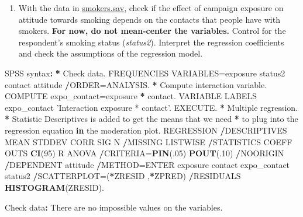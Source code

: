 \documentclass[a4paper]{book}
\newenvironment{Shaded}{\begin{snugshade}}{\end{snugshade}}
\newcommand{\KeywordTok}[1]{\textcolor[rgb]{0,0,0}{\textbf{#1}}}
\newcommand{\DecValTok}[1]{\textcolor[rgb]{0.00,0.00,0.00}{#1}}
\newcommand{\StringTok}[1]{\textcolor[rgb]{0.00,0.00,0.00}{#1}}
\newcommand{\ControlFlowTok}[1]{\textcolor[rgb]{0.00,0.00,0.00}{\textbf{#1}}}
\newcommand{\OperatorTok}[1]{\textcolor[rgb]{0.00,0.00,0.00}{\textbf{#1}}}
\newcommand{\ErrorTok}[1]{\textcolor[rgb]{0.00,0.00,0.00}{\textbf{#1}}}
\newcommand{\NormalTok}[1]{#1}
\providecommand{\tightlist}{%
  \setlength{\itemsep}{0pt}\setlength{\parskip}{0pt}}
\theoremstyle{definition}
\theoremstyle{definition}
\theoremstyle{definition}
\theoremstyle{remark}
\begin{document}
\begin{enumerate}
\def\labelenumi{\arabic{enumi}.}
\tightlist
\item
  With the data in
  \href{http://82.196.4.233:3838/data/smokers.sav}{smokers.sav}, check
  if the effect of campaign exposure on attitude towards smoking depends
  on the contacts that people have with smokers. \textbf{For now, do not
  mean-center the variables.} Control for the respondent's smoking
  status (\emph{status2}). Interpret the regression coefficients and
  check the assumptions of the regression model.
\end{enumerate}

\begin{Shaded}
\begin{Highlighting}[]
\NormalTok{SPSS syntax}\OperatorTok{:}\StringTok{  }
\StringTok{  }
\ErrorTok{*}\StringTok{ }\NormalTok{Check data.  }
\NormalTok{FREQUENCIES VARIABLES=exposure status2 contact attitude  }
  \OperatorTok{/}\NormalTok{ORDER=ANALYSIS.  }
\OperatorTok{*}\StringTok{ }\NormalTok{Compute interaction variable.  }
\NormalTok{COMPUTE expo_contact=exposure }\OperatorTok{*}\StringTok{ }\NormalTok{contact.  }
\NormalTok{VARIABLE LABELS  expo_contact }\StringTok{'Interaction exposure * contact'}\NormalTok{.  }
\NormalTok{EXECUTE.  }
\OperatorTok{*}\StringTok{ }\NormalTok{Multiple regression.  }
\OperatorTok{*}\StringTok{ }\NormalTok{Statistic Descriptives is added to get the means that we need  }
\OperatorTok{*}\StringTok{ }\NormalTok{to plug into the regression equation }\ControlFlowTok{in}\NormalTok{ the moderation plot.  }
\NormalTok{REGRESSION  }
  \OperatorTok{/}\NormalTok{DESCRIPTIVES MEAN STDDEV CORR SIG N  }
  \OperatorTok{/}\NormalTok{MISSING LISTWISE  }
  \OperatorTok{/}\NormalTok{STATISTICS COEFF OUTS }\KeywordTok{CI}\NormalTok{(}\DecValTok{95}\NormalTok{) R ANOVA  }
  \OperatorTok{/}\NormalTok{CRITERIA=}\KeywordTok{PIN}\NormalTok{(.}\DecValTok{05}\NormalTok{) }\KeywordTok{POUT}\NormalTok{(.}\DecValTok{10}\NormalTok{)  }
  \OperatorTok{/}\NormalTok{NOORIGIN   }
  \OperatorTok{/}\NormalTok{DEPENDENT attitude  }
  \OperatorTok{/}\NormalTok{METHOD=ENTER exposure contact expo_contact status2  }
  \OperatorTok{/}\NormalTok{SCATTERPLOT=(}\OperatorTok{*}\NormalTok{ZRESID ,}\OperatorTok{*}\NormalTok{ZPRED)  }
  \OperatorTok{/}\NormalTok{RESIDUALS }\KeywordTok{HISTOGRAM}\NormalTok{(ZRESID).  }
  
\NormalTok{Check data}\OperatorTok{:}\StringTok{  }
\StringTok{  }
\NormalTok{There are no impossible values on the variables.  }
  

\end{Highlighting}
\end{Shaded}
\end{document}
